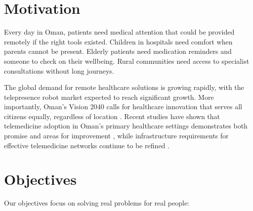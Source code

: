 \documentclass[11pt,a4paper]{article}
\begin{document}
\section{Motivation}

Every day in Oman, patients need medical attention that could be provided remotely if the right tools existed. Children in hospitals need comfort when parents cannot be present. Elderly patients need medication reminders and someone to check on their wellbeing. Rural communities need access to specialist consultations without long journeys.

The global demand for remote healthcare solutions is growing rapidly, with the telepresence robot market expected to reach significant growth. More importantly, Oman's Vision 2040 calls for healthcare innovation that serves all citizens equally, regardless of location \cite{alhinai2024}. Recent studies have shown that telemedicine adoption in Oman's primary healthcare settings demonstrates both promise and areas for improvement \cite{alsalmani2023}, while infrastructure requirements for effective telemedicine networks continue to be refined \cite{alshishtawy2013}.

\section{Objectives}

Our objectives focus on solving real problems for real people:
\end{document}
